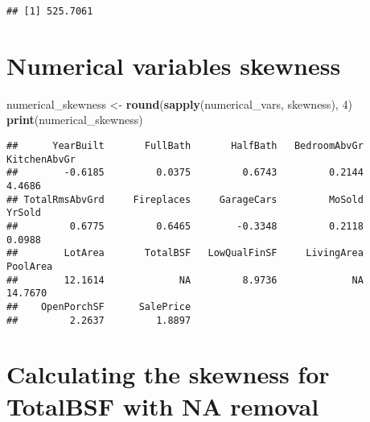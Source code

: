 \documentclass[
]{article}
\newenvironment{Shaded}{\begin{snugshade}}{\end{snugshade}}
\newcommand{\AttributeTok}[1]{\textcolor[rgb]{0.13,0.29,0.53}{#1}}
\newcommand{\ConstantTok}[1]{\textcolor[rgb]{0.56,0.35,0.01}{#1}}
\newcommand{\DecValTok}[1]{\textcolor[rgb]{0.00,0.00,0.81}{#1}}
\newcommand{\FunctionTok}[1]{\textcolor[rgb]{0.13,0.29,0.53}{\textbf{#1}}}
\newcommand{\NormalTok}[1]{#1}
\newcommand{\OtherTok}[1]{\textcolor[rgb]{0.56,0.35,0.01}{#1}}
\newcommand{\SpecialCharTok}[1]{\textcolor[rgb]{0.81,0.36,0.00}{\textbf{#1}}}
\begin{document}
\begin{Shaded}
\end{Shaded}

\begin{verbatim}
## [1] 525.7061
\end{verbatim}

\hypertarget{numerical-variables-skewness}{%
\section{Numerical variables
skewness}\label{numerical-variables-skewness}}

\begin{Shaded}
\begin{Highlighting}[]
\NormalTok{numerical\_skewness }\OtherTok{\textless{}{-}} \FunctionTok{round}\NormalTok{(}\FunctionTok{sapply}\NormalTok{(numerical\_vars, skewness), }\DecValTok{4}\NormalTok{)}
\FunctionTok{print}\NormalTok{(numerical\_skewness)}
\end{Highlighting}
\end{Shaded}

\begin{verbatim}
##      YearBuilt       FullBath       HalfBath   BedroomAbvGr   KitchenAbvGr 
##        -0.6185         0.0375         0.6743         0.2144         4.4686 
## TotalRmsAbvGrd     Fireplaces     GarageCars         MoSold         YrSold 
##         0.6775         0.6465        -0.3348         0.2118         0.0988 
##        LotArea       TotalBSF   LowQualFinSF     LivingArea       PoolArea 
##        12.1614             NA         8.9736             NA        14.7670 
##    OpenPorchSF      SalePrice 
##         2.2637         1.8897
\end{verbatim}

\hypertarget{calculating-the-skewness-for-totalbsf-with-na-removal}{%
\section{Calculating the skewness for TotalBSF with NA
removal}\label{calculating-the-skewness-for-totalbsf-with-na-removal}}
\end{document}
